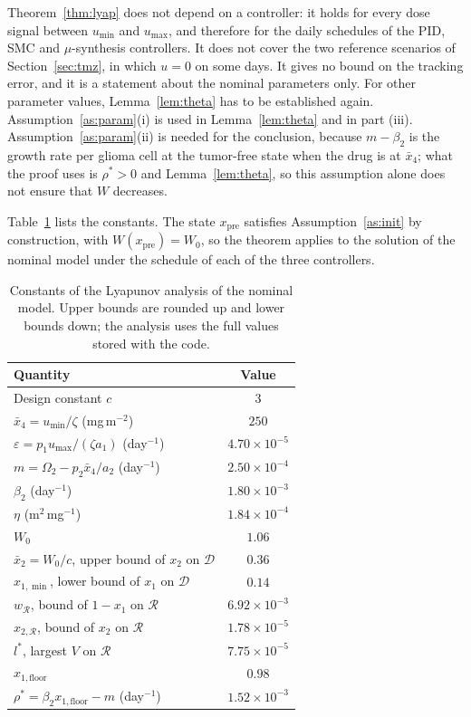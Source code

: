\begin{remark}[Scope]
\label{rem:scope}
Theorem~\ref{thm:lyap} does not depend on a controller: it holds for every dose signal between $u_{\min}$ and $u_{\max}$, and therefore for the daily schedules of the PID, SMC and $\mu$-synthesis controllers. It does not cover the two reference scenarios of Section~\ref{sec:tmz}, in which $u=0$ on some days. It gives no bound on the tracking error, and it is a statement about the nominal parameters only. For other parameter values, Lemma~\ref{lem:theta} has to be established again. Assumption~\ref{as:param}(i) is used in Lemma~\ref{lem:theta} and in part (iii). Assumption~\ref{as:param}(ii) is needed for the conclusion, because $m-\beta_2$ is the growth rate per glioma cell at the tumor-free state when the drug is at $\bar x_4$; what the proof uses is $\rho^\ast>0$ and Lemma~\ref{lem:theta}, so this assumption alone does not ensure that $W$ decreases.
\end{remark}

Table~\ref{tab:lyapunov} lists the constants. The state $x_{\mathrm{pre}}$ satisfies Assumption~\ref{as:init} by construction, with $W(x_{\mathrm{pre}})=W_0$, so the theorem applies to the solution of the nominal model under the schedule of each of the three controllers.

\begin{table}[htbp]
\centering
\caption{Constants of the Lyapunov analysis of the nominal model. Upper bounds are rounded up and lower bounds down; the analysis uses the full values stored with the code.}
\label{tab:lyapunov}
\small
\begin{tabular}{lc}
\toprule
Quantity & Value \\
\midrule
Design constant $c$ & $3$ \\
$\bar{x}_4=u_{\min}/\zeta$ (mg\,m$^{-2}$) & $250$ \\
$\varepsilon=p_1u_{\max}/(\zeta a_1)$ (day$^{-1}$) & $4.70{\times}10^{-5}$ \\
$m=\Omega_2-p_2\bar{x}_4/a_2$ (day$^{-1}$) & $2.50{\times}10^{-4}$ \\
$\beta_2$ (day$^{-1}$) & $1.80{\times}10^{-3}$ \\
$\eta$ (m$^{2}$\,mg$^{-1}$) & $1.84{\times}10^{-4}$ \\
$W_0$ & $1.06$ \\
$\bar{x}_2=W_0/c$, upper bound of $x_2$ on $\mathcal D$ & $0.36$ \\
$x_{1,\min}$, lower bound of $x_1$ on $\mathcal D$ & $0.14$ \\
$w_{\mathcal R}$, bound of $1-x_1$ on $\mathcal R$ & $6.92{\times}10^{-3}$ \\
$x_{2,\mathcal R}$, bound of $x_2$ on $\mathcal R$ & $1.78{\times}10^{-5}$ \\
$l^\ast$, largest $V$ on $\mathcal R$ & $7.75{\times}10^{-5}$ \\
$x_{1,\mathrm{floor}}$ & $0.98$ \\
$\rho^\ast=\beta_2x_{1,\mathrm{floor}}-m$ (day$^{-1}$) & $1.52{\times}10^{-3}$ \\
\bottomrule
\end{tabular}
\end{table}

